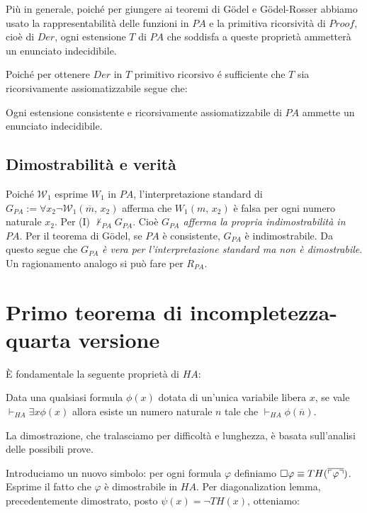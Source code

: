 	Pi\`u in generale, poich\'e per giungere ai teoremi
	di G\"odel e G\"odel-Rosser abbiamo
	usato la rappresentabilit\`a delle funzioni in $PA$ e la primitiva
	ricorsivit\`a di $Proof$, cio\`e di $Der$, ogni estensione $T$ di $PA$ che
	soddisfa a queste propriet\`a ammetter\`a un enunciato indecidibile.
	
	Poich\'e per ottenere $Der$ in $T$ primitivo ricorsivo \'e sufficiente
	che $T$ sia ricorsivamente assiomatizzabile segue che:
	
	\begin{thm}
	Ogni estensione consistente e ricorsivamente assiomatizzabile di $PA$
	ammette un enunciato indecidibile.
	\end{thm}
	
\subsection{Dimostrabilit\`a e verit\`a}
	
	Poich\'e $\mathcal{W}_1$ esprime $W_1$ in $PA$,
	l'interpretazione standard di $G_{PA}:=\forall x_2\neg
	\mathcal{W}_1(\overline{m},\,x_2)$ afferma che $W_1(m,\,x_2)$ \`e falsa per
	ogni numero naturale $x_2$. Per (I) $\not\vdash_{PA}G_{PA}$.
	Cio\`e \textit{$G_{PA}$ afferma la propria indimostrabilit\`a in
	$PA$}. Per il teorema di G\"odel, se $PA$ \`e consistente,
	$G_{PA}$ \`e indimostrabile. Da questo segue che $G_{PA}$ \textit{\`e vera per
	l'interpretazione standard ma non \`e dimostrabile}. Un ragionamento analogo
	si pu\`o fare per $R_{PA}$.
	
\section{Primo teorema di incompletezza-quarta versione}
	
	\`E fondamentale la seguente propriet\`a di $HA$:
	
	\begin{thm}
	Data una qualsiasi formula $\phi(x)$ dotata di un'unica variabile libera $x$,
	se vale $\vdash_{HA}\exists x\phi(x)$ allora esiste un numero naturale
	$n$ tale che $\vdash_{HA}\phi(\overline{n})$.
	\end{thm}
	La dimostrazione, che tralasciamo per difficolt\`a e lunghezza,
	\`e basata sull'analisi delle possibili prove.

	Introduciamo un nuovo
	simbolo: per ogni formula $\varphi$ definiamo
	$\Box\varphi\equiv TH(\overline{\ulcorner \varphi \urcorner})$.
	Esprime il fatto che $\varphi$ \`e dimostrabile in $HA$.
	Per diagonalization lemma, precedentemente dimostrato,
	posto $\psi(x)=\neg TH(x)$, otteniamo:

